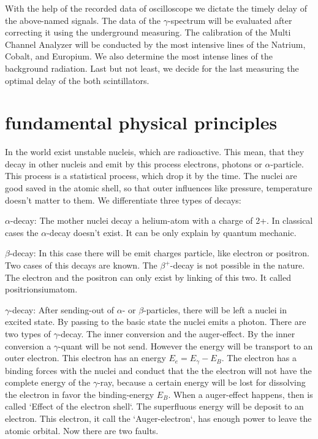 \documentclass[10pt,a4paper]{article}
\begin{document}
With the help of the recorded data of oscilloscope we dictate the timely delay of the above-named signals. The data of the $\gamma$-spectrum will be evaluated after correcting it using the underground measuring.
The calibration of the Multi Channel Analyzer will be conducted by the most intensive lines of the Natrium, Cobalt, and Europium. We also determine the most intense lines of the background radiation. Last but not least, we decide for the last measuring the optimal delay of the both scintillators.

\section{fundamental physical principles}
In the world exist unstable nucleis, which are radioactive. This mean, that they decay in other nucleis and emit by this process electrons, photons or $\alpha$-particle. This process is a statistical process, which drop it by the time. The nuclei are good saved in the atomic shell, so that outer influences like pressure, temperature doesn't matter to them. We differentiate three types of decays:

$\alpha$-decay: The mother nuclei decay a helium-atom with a charge of 2+. In classical cases the $\alpha$-decay doesn't exist. It can be only explain by quantum mechanic. 

$\beta$-decay: In this case there will be emit charges particle, like electron or positron. Two cases of this decays are known. The $\beta^{+}$-decay is not possible in the nature. The electron and the positron can only exist by linking of this two. It called positrionsiumatom. 

$\gamma$-decay: After sending-out of $\alpha$- or $\beta$-particles, there will be left a nuclei in excited state. By passing to the basic state the nuclei emits a photon.
There are two types of $\gamma$-decay. The inner conversion and the auger-effect. By the inner conversion a $\gamma$-quant will be not send. However the energy will be transport to an outer electron. This electron has an energy $E_e=E_{\gamma}-E_B$. The electron has a binding forces with the nuclei and conduct that the the electron will not have the complete energy of the $\gamma$-ray, because a certain energy will be lost for dissolving the electron in favor the binding-energy $E_B$.
When a auger-effect happens, then is called `Effect of the electron shell`. The superfluous energy will be deposit to an electron. This electron, it call the `Auger-electron`, has enough power to leave the atomic orbital. Now there are two faults.
\end{document}

